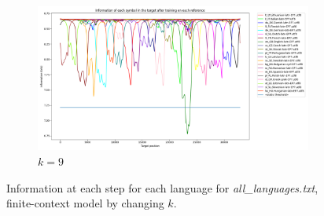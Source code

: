\documentclass{article}
\begin{document}
\begin{figure}
    \hfill
    \begin{subfigure}[b]{0.3\textwidth}
        \begin{center}
            \includegraphics[width=1.0\linewidth]{../results/all_languages/-p_c:1:9.png}
        \end{center}
        \caption{$k = 9$}
        \label{fig:all_languages_p_c:1:9}
    \end{subfigure}
    
    \caption{Information at each step for each language for \textit{all\_languages.txt}, finite-context model by changing $k$.}
    \label{fig:all_languages_p_c}
\end{figure}
\end{document}
